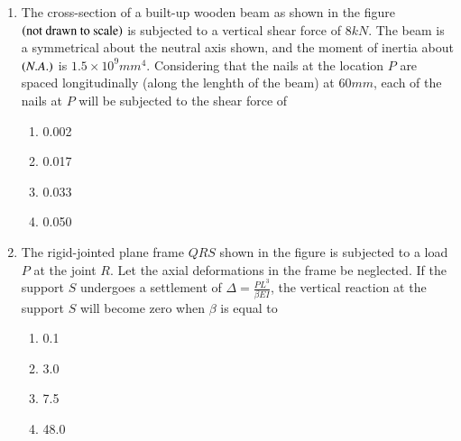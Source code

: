 \documentclass[journal,12pt,onecolumn]{IEEEtran}
\theoremstyle{remark}
\begin{document}
\begin{enumerate}
\begin{multicols}{4}
\begin{enumerate}
                    \columnbreak
                \item $\frac{ \ln \phi}{\ln\phi\ln\Psi - 1}$
                    \columnbreak
                \item $\frac{\ln \Psi}{\ln\phi\ln\Psi - 1}$
            \end{enumerate}
        \end{multicols}
    \item The cross-section of a built-up wooden beam as shown in the figure $\left(\text{not drawn to scale}\right)$
        is subjected to a vertical shear force of $8kN$. The beam is a symmetrical about the neutral axis
         shown, and the moment of inertia about $\left(N.A.\right)$ is $1.5 \times 10^9 mm^4$.
        Considering that the nails at the location $P$ are spaced longitudinally (along the lenghth of the beam)
        at $60mm$, each of the nails at $P$ will be subjected to the shear force of 
\begin{center}
            \resizebox{0.5\textwidth}{!}{
                
            } 
        \end{center}
        \hfill{}
        \begin{multicols}{4}
            \begin{enumerate}
                \item 0.002
                    \columnbreak
                \item 0.017
                    \columnbreak
                \item 0.033
                    \columnbreak
                \item 0.050
            \end{enumerate}
        \end{multicols}


    \item The rigid-jointed plane frame $QRS$ shown in the figure is subjected to a load $P$ at the 
        joint $R$. Let the axial deformations in the frame be neglected. If the support $S$ undergoes
        a settlement of $\Delta = \frac{PL^3}{\beta EI}$, the vertical reaction at the support $S$
        will become zero when $\beta$ is equal to 
\begin{center}
            \resizebox{0.5\textwidth}{!}{
                
            } 
        \end{center}
        \hfill{}
        \begin{multicols}{4}
            \begin{enumerate}
                \item 0.1
                    \columnbreak
                \item 3.0
                    \columnbreak
                \item 7.5
                    \columnbreak
                \item 48.0
            \end{enumerate}
        \end{multicols}


\end{enumerate}
\end{document}
